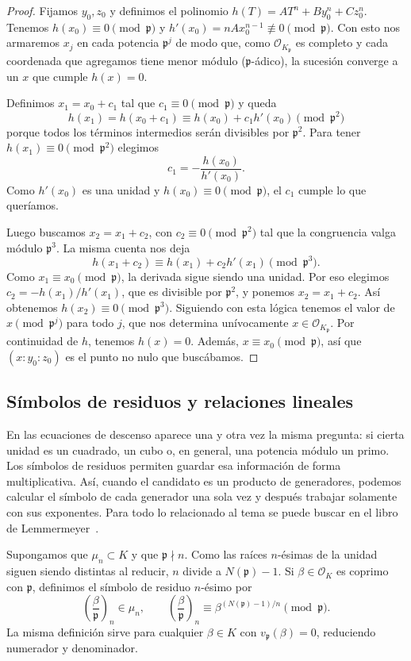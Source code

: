 \documentclass[a4paper]{book}
\theoremstyle{definition}
\theoremstyle{plain}
\newcommand{\OO}{\mathcal{O}}
\newcommand{\pp}{\mathfrak{p}}
\newcommand{\leg}[2]{\left(\frac{#1}{#2}\right)}
\begin{document}
\begin{proof}
Fijamos $y_0,z_0$ y definimos el polinomio $h(T)=AT^n+By_0^n+Cz_0^n$. Tenemos $h(x_0)\equiv0\pmod\pp$ y $h'(x_0)=nAx_0^{n-1}\not\equiv0\pmod\pp$. Con esto nos armaremos $x_j$ en cada potencia $\pp^j$ de modo que, como $\OO_{K_\pp}$ es completo y cada coordenada que agregamos tiene menor módulo ($\pp$-ádico), la sucesión converge a un $x$ que cumple $h(x)=0$.

Definimos $x_1=x_0+c_1$ tal que $c_1 \equiv 0 \pmod\pp$ y queda 
\[
h(x_1)=h(x_0+c_1)\equiv h(x_0)+c_1h'(x_0)\pmod{\pp^2}
\]
porque todos los términos intermedios serán divisibles por $\pp^2$. Para tener $h(x_1) \equiv 0 \pmod{\pp^2}$ elegimos
\[
c_1=-\frac{h(x_0)}{h'(x_0)}.
\]
Como $h'(x_0)$ es una unidad y $h(x_0)\equiv 0 \pmod \pp$, el $c_1$ cumple lo que queríamos. 

Luego buscamos $x_2=x_1+c_2$, con $c_2\equiv0\pmod{\pp^2}$ tal que la congruencia valga módulo $\pp^3$. La misma cuenta nos deja
\[
h(x_1+c_2)\equiv h(x_1)+c_2h'(x_1)\pmod{\pp^3}.
\]
Como $x_1\equiv x_0\pmod\pp$, la derivada sigue siendo una unidad. Por eso elegimos $c_2=-h(x_1)/h'(x_1)$, que es divisible por $\pp^2$, y ponemos $x_2=x_1+c_2$. Así obtenemos $h(x_2)\equiv0\pmod{\pp^3}$. Siguiendo con esta lógica tenemos el valor de $x \pmod{\pp^j}$ para todo $j$, que nos determina unívocamente $x\in \OO_{K_\pp}$. Por continuidad de $h$, tenemos $h(x)=0$. Además, $x\equiv x_0\pmod\pp$, así que $(x:y_0:z_0)$ es el punto no nulo que buscábamos.
\end{proof}

\subsection{Símbolos de residuos y relaciones lineales}\label{subsec:simbolosResiduos}

En las ecuaciones de descenso aparece una y otra vez la misma pregunta: si cierta unidad es un cuadrado, un cubo o, en general, una potencia módulo un primo. Los símbolos de residuos permiten guardar esa información de forma multiplicativa. Así, cuando el candidato es un producto de generadores, podemos calcular el símbolo de cada generador una sola vez y después trabajar solamente con sus exponentes. Para todo lo relacionado al tema se puede buscar en el libro de Lemmermeyer~\cite{Lemmermeyer2000}.

Supongamos que $\mu_n\subset K$ y que $\pp\nmid n$. Como las raíces $n$-ésimas de la unidad siguen siendo distintas al reducir, $n$ divide a $N(\pp)-1$. Si $\beta\in\OO_K$ es coprimo con $\pp$, definimos el símbolo de residuo $n$-ésimo por
\[
\leg{\beta}{\pp}_n\in\mu_n,
\qquad
\leg{\beta}{\pp}_n\equiv\beta^{(N(\pp)-1)/n}\pmod\pp.
\]
La misma definición sirve para cualquier $\beta\in K$ con $v_\pp(\beta)=0$, reduciendo numerador y denominador. 
\end{document}
